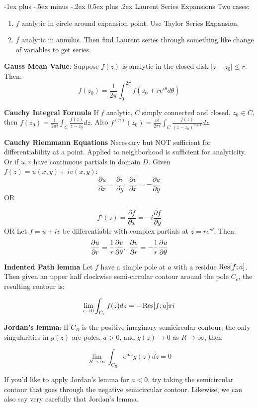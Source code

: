 \documentclass{article}
\makeatletter
\theoremstyle{definition}
\renewcommand{\section}{\@startsection{section}{1}{0mm}%
	{-1ex plus -.5ex minus -.2ex}%
	{0.5ex plus .2ex}%
	{\normalfont\large\bfseries}}
\makeatother
\begin{document}
\begin{multicols}{3}
\section{Laurent Series Expansions}
Two cases:
\begin{enumerate}
	\item $f$ analytic in circle around expansion point. Use Taylor Series Expansion.
	\item $f$ analytic in annulus. Then find Laurent series through something like change of variables to get series.
\end{enumerate}
\textbf{Gauss Mean Value}:
Suppose $f(z)$ is analytic in the closed disk $|z-z_0| \leq r$. Then:
$$f(z_0) = \frac{1}{2 \pi } \int_{0}^{2\pi} f(z_0 + r e^{i\theta} d\theta)$$

\textbf{Cauchy Integral Formula}
If $f$ analytic, $C$ simply connected and closed, $z_0 \in C$, then $f(z_0) = \frac{1}{2\pi i}\int_{C} \frac{f(z)}{z-z_0}dz$. Also $f^{(n)}(z_0) = \frac{n!}{2\pi i } \int_C \frac{f(z)}{(z-z_0)^{n+1}}dz$

\textbf{Cauchy Riemmann Equations} Necessary but NOT sufficient for differentiability at a point. Applied to neighborhood is sufficient for analyticity. Or if $u, v$ have continuous partials in domain $D$. 
Given $f(z) = u(x,y)+iv(x,y)$:
$$\frac{\partial u}{\partial x} = \frac{\partial v}{\partial y},\ \frac{\partial v}{\partial x} = -\frac{\partial u}{\partial y}$$
OR

$$f'(z) = \frac{\partial f}{\partial x} = -i \frac{\partial f}{\partial y}$$
OR 
Let $f=u+iv$ be differentiable with complex partials at $z=re^{i\theta}$. Then:
$$\pdv{u}{r} = \frac{1}{r} \pdv{v}{\theta},\ \pdv{v}{r} = -\frac{1}{r} \pdv{u}{\theta}$$


\textbf{Indented Path lemma}
Let $f$ have a simple pole at $a$ with a residue $\Res[f;a]$. Then given an upper half clockwise semi-circular contour around the pole $C_\epsilon$, the resulting contour is:

\begin{align}
\lim_{\epsilon\to0} \int_{C_\epsilon} f(z) dz = -\Res[f;a]\pi i
\end{align}

\textbf{Jordan's lemma}: If $C_R$ is the positive imaginary semicircular contour, the only singularities in $g(z)$ are poles, $a>0$, and $g(z) \to 0$ as $R \to \infty$, then 

$$\lim_{R \to \infty} \int_{C_R}e^{iaz}g(z) dz = 0$$

If you'd like to apply Jordan's lemma for $a<0$, try taking the semicircular contour that goes through the negative semicircular contour. Likewise, we can also say very carefully that Jordan's lemma.


\end{multicols}
\end{document}
